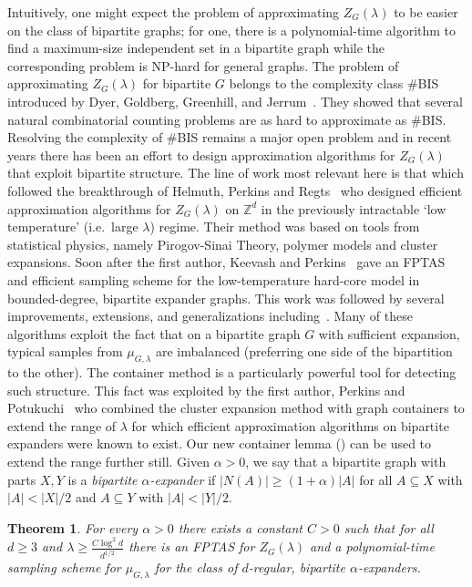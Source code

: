 \documentclass[a4paper]{amsart}
\newtheorem{thm}{Theorem}[section]
\theoremstyle{definition}
\newcommand{\Z}{\mathbb{Z}}
\newcommand{\0}[0]{\emptyset}
\newcommand{\lam}{\lambda}
\begin{document}
Intuitively, one might expect the problem of approximating $Z_G(\lam)$ to be easier on the class of bipartite graphs; for one, there is a polynomial-time algorithm to find a maximum-size independent set in  a bipartite graph while the corresponding problem is NP-hard for general graphs. The problem of approximating $Z_G(\lam)$ for bipartite $G$ belongs to the complexity class  \#BIS introduced by Dyer, Goldberg, Greenhill, and Jerrum~\cite{dyer2000relative}. They showed that several natural combinatorial counting problems are as hard to approximate as \#BIS. Resolving the complexity of \#BIS remains a major open problem and in recent years there has been an effort to design approximation algorithms for $Z_G(\lam)$ that exploit bipartite structure. The line of work most relevant here is that which followed the breakthrough of Helmuth, Perkins and Regts~\cite{HelmuthAlgorithmic2} who designed efficient approximation algorithms for  $Z_G(\lam)$ on $\Z^d$ in the previously intractable `low temperature' (i.e.\ large $\lam$) regime. Their method was based on tools from statistical physics, namely Pirogov-Sinai Theory, polymer models and cluster expansions. Soon after the first author, Keevash and Perkins~\cite{JKP2} gave an FPTAS and efficient sampling scheme for the low-temperature hard-core model in bounded-degree, bipartite expander graphs. This work was followed by several improvements, extensions, and generalizations including~\cite{cannon2020counting,chen2021fast,chen2021sampling,friedrich2020polymer,galanis2020fast,galanis2021fast,liao2019counting}.  Many of these algorithms exploit the fact that on a bipartite graph $G$ with sufficient expansion, typical samples from $\mu_{G,\lam}$ are imbalanced (preferring one side of the bipartition to the other). The container method is a particularly powerful tool for detecting such structure. This fact was exploited by the first author, Perkins and Potukuchi~\cite{jenssen2023approximately} who combined the cluster expansion method with graph containers to extend the range of $\lam$ for which efficient approximation algorithms on bipartite expanders were known to exist. Our new container lemma () can be used to extend the range further still. Given $\alpha>0$, we say that a bipartite graph with parts $X,Y$ is a \emph{bipartite $\alpha$-expander} if $|N(A)|\geq (1+\alpha)|A|$ for all $A\subseteq X$ with $|A|<|X|/2$ and $A\subseteq Y$ with $|A|<|Y|/2$. 

\begin{thm}\label{algos}
    For every $\alpha>0$ there exists a constant $C>0$ such that for all $d\geq 3$ and $\lam\geq \frac{C\log^2 d}{d^{1/2}}$ there is an FPTAS for $Z_G(\lam)$ and a polynomial-time sampling scheme for $\mu_{G, \lam}$ for the class of $d$-regular, bipartite $\alpha$-expanders.
\end{thm}
\end{document}
